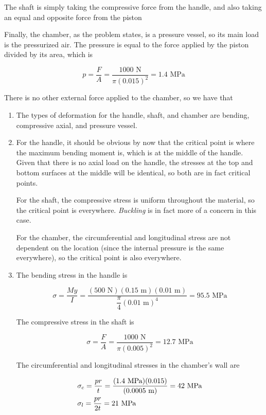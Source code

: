 \documentclass[a4paper,openany,nobib]{tufte-book}
\begin{document}
{{\begin{enumerate}
The shaft is simply taking the compressive force from the handle, and
also taking an equal and opposite force from the piston


Finally, the chamber, as the problem states, is a pressure vessel, so
its main load is the pressurized air. The pressure is equal to the
force applied by the piston divided by its area, which is

$$p = \frac{F}{A} = \frac{1000 \text{ N}}{\pi (0.015)^2} = 1.4 \text{ MPa}$$

There is no other external force applied to the chamber, so we have
that


\begin{enumerate}
\item The types of deformation for the handle, shaft, and chamber are
bending, compressive axial, and pressure vessel.

\item For the handle, it should be obvious by now that the critical point
is where the maximum bending moment is, which is at the middle of the
handle. Given that there is no axial load on the handle, the stresses
at the top and bottom surfaces at the middle will be identical, so
both are in fact critical points.

For the shaft, the compressive stress is uniform throughout the
material, so the critical point is everywhere. \emph{Buckling} is in fact
more of a concern in this case.

For the chamber, the circumferential and longitudinal stress are not
dependent on the location (since the internal pressure is the same
everywhere), so the critical point is also everywhere.

\item The bending stress in the handle is

$$\sigma = \frac{My}{I} = \frac{(500 \text{ N})(0.15 \text{ m})(0.01 \text{ m})}{\dfrac{\pi }{4}{(0.01 \text{ m})^4}} = 95.5 \text{ MPa}$$

The compressive stress in the shaft is

$$\sigma = \frac{F}{A} = \frac{1000 \text{ N}}{\pi (0.005)^2} = 12.7 \text{ MPa}$$

The circumferential and longitudinal stresses in the chamber's wall
are

$$\begin{gathered}
     \sigma_c = \frac{pr}{t} = \frac{(1.4 \text{ MPa})(0.015)}{(0.0005 \text{ m})} = 42 \text{ MPa} \hfill \\
     \sigma_l = \frac{pr}{2t} = 21 \text{ MPa} \hfill \\ 
   \end{gathered}$$


\end{enumerate}
\end{enumerate}}}
\end{document}
